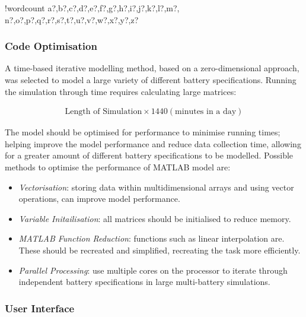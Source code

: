 \documentclass[fontsize=9.5pt]{extarticle}
\numberwithin{figure}{section} %
\providecommand{\tightlist}{%
  \setlength{\itemsep}{0pt}\setlength{\parskip}{0pt}}
\newcounter{words}
\newenvironment{counted}{%
  \setcounter{words}{0}
  \SearchList!{wordcount}{\stepcounter{words}}
    {a?,b?,c?,d?,e?,f?,g?,h?,i?,j?,k?,l?,m?,
    n?,o?,p?,q?,r?,s?,t?,u?,v?,w?,x?,y?,z?}
  \UndoBoundary{'}
  \SearchOrder{p;}}{%
  \StopSearching}
\begin{document}
\begin{counted}
\subsubsection{Code Optimisation}\label{code-optimisation}

A time-based iterative modelling method, based on a zero-dimensional
approach, was selected to model a large variety of different battery
specifications. Running the simulation through time requires calculating
large matrices:

\begin{align*}
\text{Length of Simulation}  \times 1440 (\text{minutes in a day})
\end{align*}

The model should be optimised for performance to minimise running times;
helping improve the model performance and reduce data collection time,
allowing for a greater amount of different battery specifications to be
modelled. Possible methods to optimise the performance of MATLAB model
are:

\begin{itemize}
\tightlist
\item
  \emph{Vectorisation}: storing data within multidimensional arrays and
  using vector operations, can improve model performance.
\item
  \emph{Variable Initailisation}: all matrices should be initialised to
  reduce memory.
\item
  \emph{MATLAB Function Reduction}: functions such as linear
  interpolation are. These should be recreated and simplified,
  recreating the task more efficiently.
\item
  \emph{Parallel Processing}: use multiple cores on the processor to
  iterate through independent battery specifications in large
  multi-battery simulations.
\end{itemize}

\subsubsection{User Interface}\label{user-interface}


\end{counted}
\end{document}
